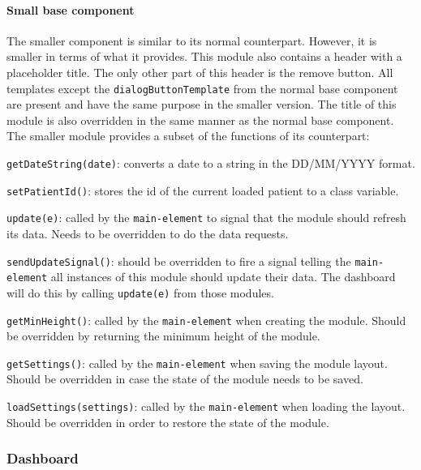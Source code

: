             \paragraph{Small base component} The smaller component is similar to its normal counterpart. However, it is smaller in terms of what it provides. This module also contains a header with a placeholder title. The only other part of this header is the remove button. All templates except the \texttt{dialogButtonTemplate} from the normal base component are present and have the same purpose in the smaller version. The title of this module is also overridden in the same manner as the normal base component. The smaller module provides a subset of the functions of its counterpart:
            \vspace{-6pt}
            \begin{myitemize}
                \item \texttt{getDateString(date)}: converts a date to a string in the DD/MM/YYYY format.
                \item \texttt{setPatientId()}: stores the id of the current loaded patient to a class variable.
                \item \texttt{update(e)}: called by the \texttt{main-element} to signal that the module should refresh its data. Needs to be overridden to do the data requests.
                \item \texttt{sendUpdateSignal()}: should be overridden to fire a signal telling the \texttt{main-element} all instances of this module should update their data. The dashboard will do this by calling \texttt{update(e)} from those modules.
                \item \texttt{getMinHeight()}: called by the \texttt{main-element} when creating the module. Should be overridden by returning the minimum height of the module.
                \item \texttt{getSettings()}: called by the \texttt{main-element} when saving the module layout. Should be overridden in case the state of the module needs to be saved.
                \item \texttt{loadSettings(settings)}: called by the \texttt{main-element} when loading the layout. Should be overridden in order to restore the state of the module.
            \end{myitemize}

        \subsubsection{Dashboard}

